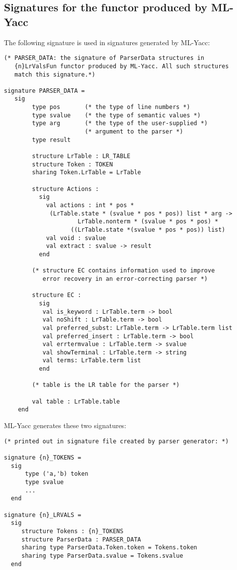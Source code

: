 \documentclass{article}
\begin{document}
\subsection{Signatures for the functor produced by ML-Yacc}

The following signature is used in signatures generated by
ML-Yacc:
\begin{tt}
\begin{verbatim}
(* PARSER_DATA: the signature of ParserData structures in
   {n}LrValsFun functor produced by ML-Yacc. All such structures
   match this signature.*)

signature PARSER_DATA =
   sig
        type pos       (* the type of line numbers *)
        type svalue    (* the type of semantic values *)
        type arg       (* the type of the user-supplied *)
                       (* argument to the parser *)
        type result

        structure LrTable : LR_TABLE
        structure Token : TOKEN
        sharing Token.LrTable = LrTable

        structure Actions : 
          sig
            val actions : int * pos *
             (LrTable.state * (svalue * pos * pos)) list * arg ->
                     LrTable.nonterm * (svalue * pos * pos) *
                   ((LrTable.state *(svalue * pos * pos)) list)
            val void : svalue
            val extract : svalue -> result
          end

        (* structure EC contains information used to improve
           error recovery in an error-correcting parser *)

        structure EC :
          sig
           val is_keyword : LrTable.term -> bool
           val noShift : LrTable.term -> bool
           val preferred_subst: LrTable.term -> LrTable.term list
           val preferred_insert : LrTable.term -> bool
           val errtermvalue : LrTable.term -> svalue
           val showTerminal : LrTable.term -> string
           val terms: LrTable.term list
          end

        (* table is the LR table for the parser *)

        val table : LrTable.table
    end
\end{verbatim}
\end{tt}

ML-Yacc generates these two signatures:
\begin{tt}
\begin{verbatim}
(* printed out in signature file created by parser generator: *)

signature {n}_TOKENS = 
  sig
      type ('a,'b) token
      type svalue
      ...
  end

signature {n}_LRVALS =
  sig
     structure Tokens : {n}_TOKENS
     structure ParserData : PARSER_DATA
     sharing type ParserData.Token.token = Tokens.token
     sharing type ParserData.svalue = Tokens.svalue
  end
\end{verbatim}
\end{tt}
\end{document}
